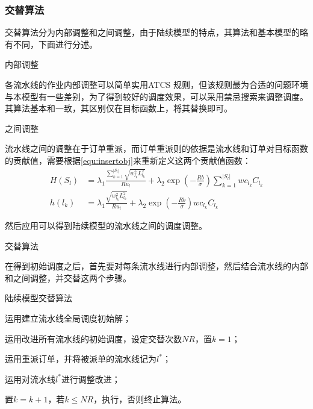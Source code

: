 \subsubsection{交替算法}
交替算法分为内部调整和之间调整，由于陆续模型的特点，其算法和基本模型的略有不同，下面进行分述。
\begin{asparaenum}
\item 内部调整

各流水线的作业内部调整可以简单实用ATCS 规则，但该规则最为合适的问题环境与本模型有一些差别，为了得到较好的调度效果，可以采用禁忌搜索来调整调度。其算法基本和一致，其区别仅在目标函数上，将其替换即可。

\item 之间调整

流水线之间的调整在于订单重派，而订单重派则的依据是流水线和订单对目标函数的贡献值，需要根据\eqref{equ:insertobj}来重新定义这两个贡献值函数：
\begin{align}
H(S_l) &= \lambda_1\frac{\sum_{k=1}^{|S_l|}\sqrt{w_{l_k}^2L_{l_k}^2}}{Ru_l} + \lambda_2 \exp\left(-\frac{Rb}{\sigma}\right)\sum_{k=1}^{|S_l|}wc_{l_k}C_{l_k}\label{equ:lineinsertfunct}\\
h(l_k) &= \lambda_1\frac{\sqrt{w_{l_k}^2L_{l_k}^2}}{Ru_l} + \lambda_2 \exp\left(-\frac{Rb}{\sigma}\right)wc_{l_k}C_{l_k}
\label{equ:iteminsertfunct}
\end{align}

然后应用可以得到陆续模型的流水线之间的调度调整。
\item 交替算法
\end{asparaenum}

在得到初始调度之后，首先要对每条流水线进行内部调整，然后结合流水线的内部和之间调整，并交替这两个步骤。
\begin{algori}
陆续模型交替算法\label{alg:inturncontinue}
\begin{asparaenum}
\renewcommand{\labelenumi}{\bf Step\theenumi~}
\item 运用建立流水线全局调度初始解；
\item 运用改进所有流水线的初始调度，设定交替次数$NR$，置$k = 1$；
\item 运用重派订单，并将被派单的流水线记为$l^*$；
\item 运用对流水线$l^*$进行调整改进；
\item 置$k = k+1$，若$k\le NR$，执行，否则终止算法。
\end{asparaenum}
\end{algori}

